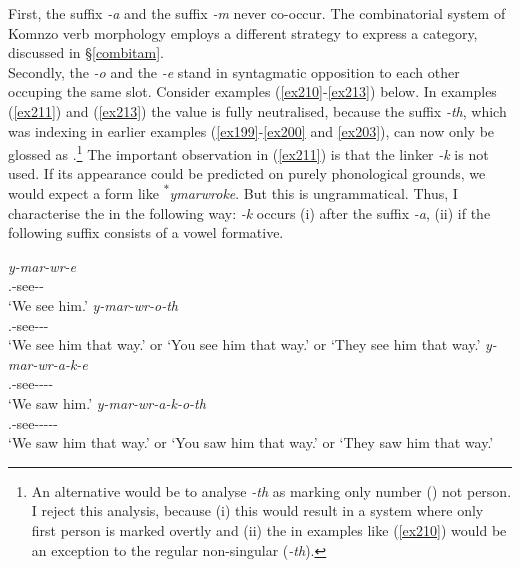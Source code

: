 First, the  suffix \emph{-a} and the  suffix \emph{-m} never co-occur. The combinatorial system of Komnzo verb morphology employs a different strategy to express a   category, discussed in \S{}\ref{combitam}.\\

Secondly, the  \emph{-o} and the \Fnsg{} \emph{-e} stand in syntagmatic opposition to each other occuping the same slot. Consider examples (\ref{ex210}-\ref{ex213}) below. In examples (\ref{ex211}) and (\ref{ex213}) the  value is fully neutralised, because the suffix \emph{-th}, which was indexing \Stnsg{} in earlier examples (\ref{ex199}-\ref{ex200} and \ref{ex203}), can now only be glossed as \Nsg{}.\footnote{An alternative would be to analyse \emph{-th} as marking only number (\Nsg) not person. I reject this analysis, because (i) this would result in a system where only first person is marked overtly and (ii) the \Fnsg{} in examples like (\ref{ex210}) would be an exception to the regular non-singular (\emph{-th}).} The important observation in (\ref{ex211}) is that the linker \emph{-k} is not used. If its appearance could be predicted on purely phonological grounds, we would expect a form like \textsuperscript{$\ast$}\emph{ymarwroke}. But this is ungrammatical. Thus, I characterise the  in the following way: \emph{-k} occurs (i) after the  suffix \emph{-a}, (ii) if the following suffix consists of a vowel formative.

\begin{exe}
\ex
\begin{xlist}
	\ex
	\gll \emph{y-mar-wr-e}\\
	\Tsg.\Masc-see-\Ndu-\Fnsg\\
	\trans `We see him.'
	\label{ex210}
	\ex
	\gll \emph{y-mar-wr-o-th}\\
	\Tsg.\Masc-see-\Ndu-\Andat-\Nsg\\
	\trans `We see him that way.' or `You see him that way.' or `They see him that way.'
	\label{ex211}
	\ex
	\gll \emph{y-mar-wr-a-k-e}\\
	\Tsg.\Masc-see-\Ndu-\Pst-\Lk-\Fnsg\\
	\trans `We saw him.'
	\label{ex212}
	\ex
	\gll \emph{y-mar-wr-a-k-o-th}\\
	\Tsg.\Masc-see-\Ndu-\Pst-\Lk-\Andat-\Nsg\\
	\trans `We saw him that way.' or `You saw him that way.' or `They saw him that way.'
	\label{ex213}
\end{xlist}
\end{exe}

